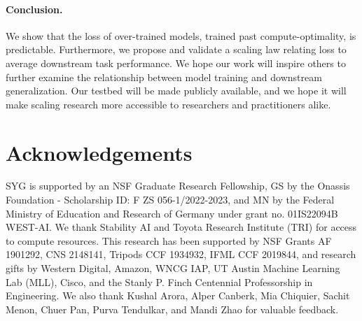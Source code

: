 \paragraph{Conclusion.}
We show that the loss of over-trained models, trained past compute-optimality, is predictable. Furthermore, we propose and validate a scaling law relating loss to average downstream task performance.
We hope our work will inspire others to further examine the relationship between model training and downstream generalization.
Our testbed will be made publicly available, and we hope it will make scaling research more accessible to researchers and practitioners alike.

\section*{Acknowledgements}
SYG is supported by an NSF Graduate Research Fellowship,
GS by the Onassis Foundation - Scholarship ID: F ZS 056-1/2022-2023, and MN by the Federal Ministry of Education and Research of Germany under grant no. 01IS22094B WEST-AI.
We thank Stability AI and Toyota Research Institute (TRI) for access to compute resources.
This research has been supported by NSF Grants AF 1901292, CNS 2148141, Tripods CCF 1934932, IFML CCF 2019844, and research gifts by Western Digital, Amazon, WNCG IAP, UT Austin Machine Learning Lab (MLL), Cisco, and the Stanly P. Finch Centennial Professorship in Engineering.
We also thank Kushal Arora, Alper Canberk, Mia Chiquier, Sachit Menon, Chuer Pan, Purva Tendulkar, and Mandi Zhao for valuable feedback.